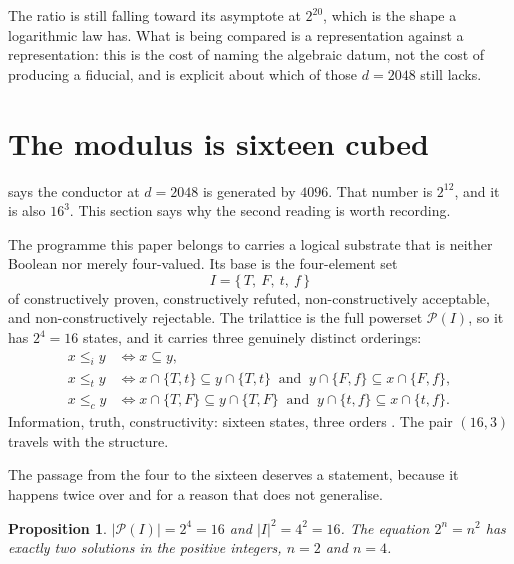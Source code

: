 \documentclass[12pt,a4paper]{article}
\newtheorem{proposition}[theorem]{Proposition}
\begin{document}
The ratio is still falling toward its asymptote at $2^{20}$, which is the shape
a logarithmic law has. What is being compared is a representation against a
representation: this is the cost of naming the algebraic datum, not the cost of
producing a fiducial, and  is explicit about which of those
$d=2048$ still lacks.

\section{The modulus is sixteen cubed}
\label{sec:sixteen}

 says the conductor at $d=2048$ is generated by $4096$. That
number is $2^{12}$, and it is also $16^{3}$. This section says why the second
reading is worth recording.

The programme this paper belongs to carries a logical substrate that is neither
Boolean nor merely four-valued. Its base is the four-element set
\[
  I = \{\,T,\ F,\ t,\ f\,\}
\]
of constructively proven, constructively refuted, non-constructively acceptable,
and non-constructively rejectable. The trilattice is the full powerset
$\mathcal{P}(I)$, so it has $2^{4} = 16$ states, and it carries three genuinely
distinct orderings:
\begin{align}
  x \le_{i} y &\iff x \subseteq y, \label{eq:order-i}\\
  x \le_{t} y &\iff x \cap \{T,t\} \subseteq y \cap \{T,t\}
                \ \text{ and }\ y \cap \{F,f\} \subseteq x \cap \{F,f\},
                \label{eq:order-t}\\
  x \le_{c} y &\iff x \cap \{T,F\} \subseteq y \cap \{T,F\}
                \ \text{ and }\ y \cap \{t,f\} \subseteq x \cap \{t,f\}.
                \label{eq:order-c}
\end{align}
Information, truth, constructivity: sixteen states, three orders
\cite{Belnap1977,Shramko2005}. The pair $(16,3)$ travels with the structure.

The passage from the four to the sixteen deserves a statement, because it
happens twice over and for a reason that does not generalise.

\begin{proposition}\label{prop:coincidence}
$|\mathcal{P}(I)| = 2^{4} = 16$ and $|I|^{2} = 4^{2} = 16$. The equation
$2^{n} = n^{2}$ has exactly two solutions in the positive integers, $n = 2$ and
$n = 4$.
\end{proposition}
\end{document}
